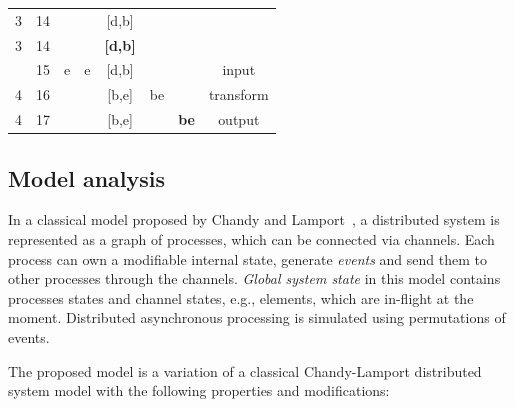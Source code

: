 \begin{table}[htbp]
\begin {center}
\begin{tabular}{c|l|c|c|c|c|c|c}
3   &   14   &       &               &   [d,b]         &       &           &    \\
3   &   14   &       &               &   {\bf [d,b]}   &       &           &    \\
\arrayrulecolor{red}\hline
4   &   15   &  e    &   e           &   [d,b]   &      &           &   input \\
4   &   16   &       &              &   [b,e]   &   be    &          &   transform \\
4   &   17   &       &              &   [b,e]   &       &   {\bf be}       &   output \\
\end{tabular}
\label{concat_example}
\end {center}
\end{table}

\subsection{Model analysis}

In a classical model proposed by Chandy and Lamport~\cite{Chandy:1985:DSD:214451.214456}, a distributed system is represented as a graph of processes, which can be connected via channels. Each process can own a modifiable internal state, generate {\em events} and send them to other processes through the channels. {\em Global system state} in this model contains processes states and channel states, e.g., elements, which are in-flight at the moment. Distributed asynchronous processing is simulated using permutations of events.

The proposed model is a variation of a classical Chandy-Lamport distributed system model with the following properties and modifications:

